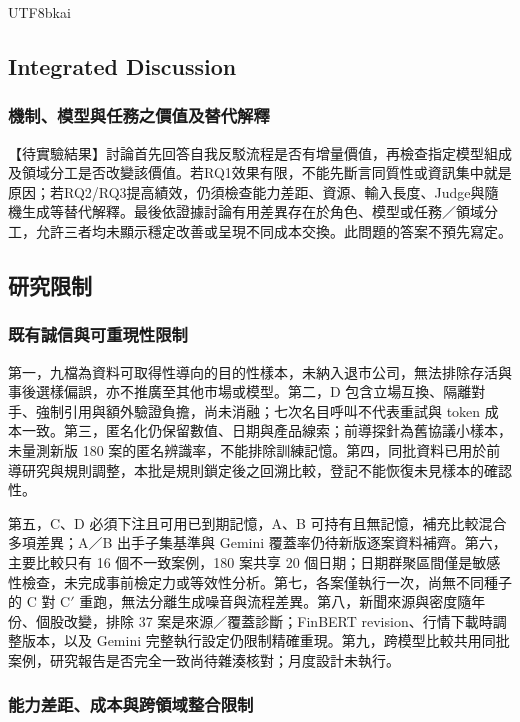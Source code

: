 \documentclass[12pt,a4paper]{article}
\newcommand{\grp}[1]{\textsf{#1}}
\begin{document}
\begin{CJK}{UTF8}{bkai}
\subsection{Integrated Discussion}

\subsubsection{機制、模型與任務之價值及替代解釋}

【待實驗結果】討論首先回答自我反駁流程是否有增量價值，再檢查指定模型組成及領域分工是否改變該價值。若RQ1效果有限，不能先斷言同質性或資訊集中就是原因；若RQ2/RQ3提高績效，仍須檢查能力差距、資源、輸入長度、Judge與隨機生成等替代解釋。最後依證據討論有用差異存在於角色、模型或任務／領域分工，允許三者均未顯示穩定改善或呈現不同成本交換。此問題的答案不預先寫定。

\subsection{研究限制}

\subsubsection{既有誠信與可重現性限制}
第一，九檔為資料可取得性導向的目的性樣本，未納入退市公司，無法排除存活與事後選樣偏誤，亦不推廣至其他市場或模型。第二，\grp{D} 包含立場互換、隔離對手、強制引用與額外驗證負擔，尚未消融；七次名目呼叫不代表重試與 token 成本一致。第三，匿名化仍保留數值、日期與產品線索；前導探針為舊協議小樣本，未量測新版 180 案的匿名辨識率，不能排除訓練記憶。第四，同批資料已用於前導研究與規則調整，本批是規則鎖定後之回溯比較，登記不能恢復未見樣本的確認性。

第五，\grp{C}、\grp{D} 必須下注且可用已到期記憶，\grp{A}、\grp{B} 可持有且無記憶，補充比較混合多項差異；A／B 出手子集基準與 Gemini 覆蓋率仍待新版逐案資料補齊。第六，主要比較只有 16 個不一致案例，180 案共享 20 個日期；日期群聚區間僅是敏感性檢查，未完成事前檢定力或等效性分析。第七，各案僅執行一次，尚無不同種子的 C 對 C$'$ 重跑，無法分離生成噪音與流程差異。第八，新聞來源與密度隨年份、個股改變，排除 37 案是來源／覆蓋診斷；FinBERT revision、行情下載時調整版本，以及 Gemini 完整執行設定仍限制精確重現。第九，跨模型比較共用同批案例，研究報告是否完全一致尚待雜湊核對；月度設計未執行。
\subsubsection{能力差距、成本與跨領域整合限制}


\end{CJK}
\end{document}
